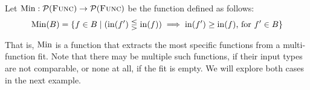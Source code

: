 \noindent Let $\operatorname{Min} : \mathcal{P}(\textsc{Func}) \rightarrow \mathcal{P}(\textsc{Func})$ be the function defined as follows:
\begin{align*}
	\operatorname{Min}(B) = \{ f \in B \mid (\operatorname{in}(f') \lesseqgtr \operatorname{in}(f)) \implies \operatorname{in}(f') \geq \operatorname{in}(f) \text{, for } f' \in B \}
\end{align*}

\noindent That is, $\operatorname{Min}$ is a function that extracts the most specific functions from a multi-function fit. Note that there may be multiple such functions, if their input types are not comparable, or none at all, if the fit is empty. We will explore both cases in the next example.

\begin{example}
	
\end{example}






